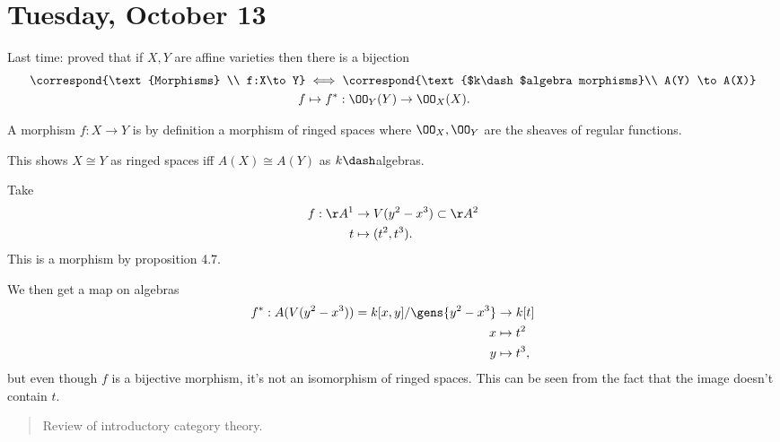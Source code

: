 \hypertarget{tuesday-october-13}{%
\section{Tuesday, October 13}\label{tuesday-october-13}}

Last time: proved that if \(X, Y\) are affine varieties then there is a
bijection
\begin{align*}  
\correspond{\text{Morphisms} \\ f:X\to Y}
&\iff
\correspond{\text{$k\dash$algebra morphisms}\\ A(Y) \to A(X)}
\\
f & \mapsto f^*: \OO_Y(Y) \to \OO_X(X)
.\end{align*}

\begin{remark}

A morphism \(f:X\to Y\) is by definition a morphism of ringed spaces
where \(\OO_X, \OO_Y\) are the sheaves of regular functions.

\end{remark}

\begin{remark}

This shows \(X\cong Y\) as ringed spaces iff \(A(X) \cong A(Y)\) as
\(k\dash\)algebras.

\end{remark}

\begin{example}

Take
\begin{align*}  
f: \AA^1 &\to V(y^2 - x^3) \subset \AA^2\\
t &\mapsto (t^2, t^3)
.\end{align*} This is a morphism by proposition 4.7.

We then get a map on algebras
\begin{align*}  
f^*: A(V(y^2 - x^3)) = k[x, y] / \gens{y^2 - x^3} &\to k[t] \\
x & \mapsto t^2 \\
y & \mapsto t^3
,\end{align*} but even though \(f\) is a bijective morphism, it's not an
isomorphism of ringed spaces. This can be seen from the fact that the
image doesn't contain \(t\).

\end{example}

\begin{quote}
Review of introductory category theory.
\end{quote}

